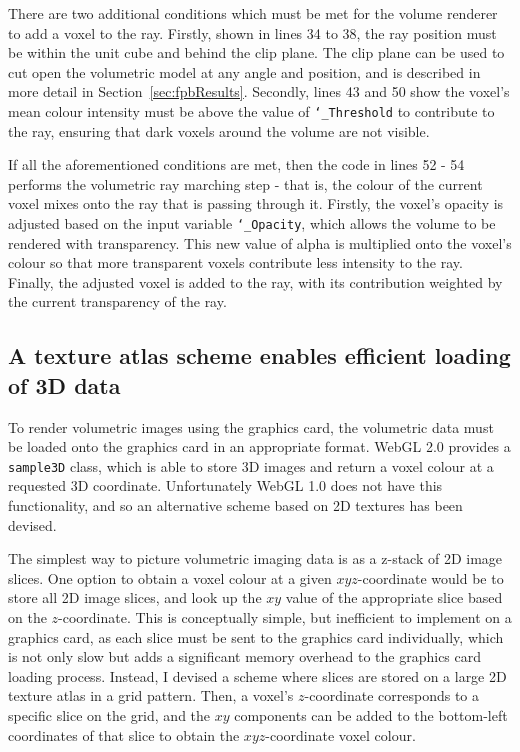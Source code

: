 There are two additional conditions which must be met for the volume renderer to add a voxel to the ray.
Firstly, shown in lines 34 to 38, the ray position must be within the unit cube and behind the clip plane.
The clip plane can be used to cut open the volumetric model at any angle and position, and is described in more detail in Section~\ref{sec:fpbResults}.
Secondly, lines 43 and 50 show the voxel's mean colour intensity must be above the value of \texttt{\char`_Threshold} to contribute to the ray, ensuring that dark voxels around the volume are not visible.

If all the aforementioned conditions are met, then the code in lines 52 - 54 performs the volumetric ray marching step - that is, the colour of the current voxel mixes onto the ray that is passing through it.
Firstly, the voxel's opacity is adjusted based on the input variable \texttt{\char`_Opacity}, which allows the volume to be rendered with transparency.
This new value of alpha is multiplied onto the voxel's colour so that more transparent voxels contribute less intensity to the ray.
Finally, the adjusted voxel is added to the ray, with its contribution weighted by the current transparency of the ray.

\subsection{A texture atlas scheme enables efficient loading of 3D data} \label{sec:fpbVolumeRendering}
To render volumetric images using the graphics card, the volumetric data must be loaded onto the graphics card in an appropriate format.
WebGL 2.0 provides a \texttt{sample3D} class, which is able to store 3D images and return a voxel colour at a requested 3D coordinate.
Unfortunately WebGL 1.0 does not have this functionality, and so an alternative scheme based on 2D textures has been devised.

The simplest way to picture volumetric imaging data is as a z-stack of 2D image slices.
One option to obtain a voxel colour at a given $xyz$-coordinate would be to store all 2D image slices, and look up the $xy$ value of the appropriate slice based on the $z$-coordinate.
This is conceptually simple, but inefficient to implement on a graphics card, as each slice must be sent to the graphics card individually, which is not only slow but adds a significant memory overhead to the graphics card loading process.
Instead, I devised a scheme where slices are stored on a large 2D texture atlas in a grid pattern.
Then, a voxel's $z$-coordinate corresponds to a specific slice on the grid, and the $xy$ components can be added to the bottom-left coordinates of that slice to obtain the $xyz$-coordinate voxel colour.

